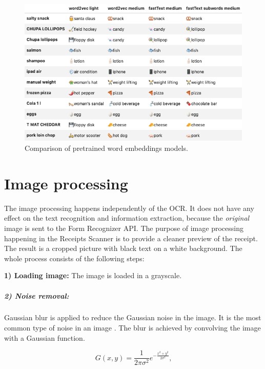 \documentclass[
  digital, %
  table,   %
  oneside, %
  lof,     %
  lot,     %
]{fithesis3}
\begin{document}
\begin{figure}
    \begin{center}
        \includegraphics[width=1\textwidth]{figures/tables/model_comparison}
    \end{center}
    \caption{Comparison of pretrained word embeddings models.}
    \label{fig:models_comparison}
\end{figure}

\chapter{Image processing}
The image processing happens independently of the OCR. It does not have any effect on the text recognition and information extraction, because the \textit{original} image is sent to the Form Recognizer API. The purpose of image processing happening in the Receipts Scanner is to provide a cleaner preview of the receipt. The result is a cropped picture with black text on a white background. The whole process consists of the following steps:

\textbf{1) Loading image:} The image is loaded in a grayscale.

\paragraph{2) Noise removal:} Gaussian blur is applied to reduce the Gaussian noise in the image. It is the most common type of noise in an image \cite{OCRCNN}. The blur is achieved by convolving the image with a Gaussian function.

\begin{equation}
G(x,y) = \frac{1}{2\pi\sigma^2}e^{-\frac{x^2+y^2}{2\sigma^2}}\text{,}
\end{equation}
\end{document}
